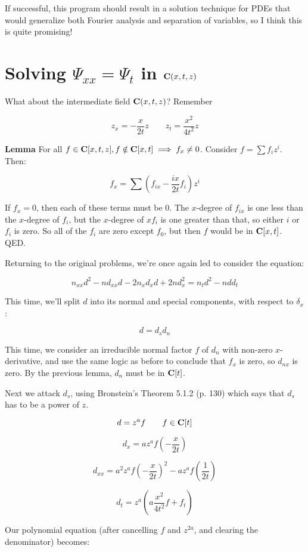 \documentclass{article}
\newcommand{\C}{\ensuremath{{\bf C}}}
\begin{document}
If successful, this program should result in a solution technique for
PDEs that would generalize both Fourier analysis and separation of
variables, so I think this is quite promising!


\vfill\eject
\section*{Solving $\Psi_{xx}=\Psi_t$ in $\C(x,t,z)$}

What about the intermediate field $\C(x,t,z)$?  Remember

$$z_x = -\frac{x}{2t} z \qquad z_t = \frac{x^2}{4t^2} z$$

{\bf Lemma}  For all $f \in \C[x,t,z], f \notin \C[x,t] \implies f_x \ne 0$.
Consider $f = \sum f_i z^i$.  Then:

$$f_x = \sum \left( f_{ix} - \frac{ix}{2t} f_i \right) z^i$$

If $f_x = 0$, then each of these terms must be 0.  The $x$-degree of $f_{ix}$
is one less than the $x$-degree of $f_i$, but the $x$-degree of $xf_i$ is
one greater than that, so either $i$ or $f_i$ is zero.  So all of the $f_i$
are zero except $f_0$, but then $f$ would be in $\C[x,t]$.  QED.

Returning to the original problems, we're once again led to consider the equation:

$$n_{xx} d^2 - n d_{xx} d - 2 n_{x}d_{x}d + 2nd_x^2 = n_t d^2 - n d d_t$$

This time, we'll split $d$ into its normal and special components,
with respect to $\delta_x$:

$$d =d_s d_n$$

This time, we consider an irreducible normal factor $f$ of $d_n$ with
non-zero $x$-derivative, and use the same logic as before to conclude
that $f_x$ is zero, so $d_{nx}$ is zero.  By the previous lemma,
$d_{n}$ must be in $\C[t]$.

Next we attack $d_s$, using Bronstein's Theorem 5.1.2 (p. 130) which
says that $d_s$ has to be a power of $z$.

$$d=z^a f \qquad f \in \C[t]$$

$$d_x = a z^a f \left( - \frac{x}{2t} \right)$$

$$d_{xx} = a^2 z^a f \left( - \frac{x}{2t} \right)^2 - a z^a f \left( \frac{1}{2t} \right)$$

$$d_t = z^a \left( a \frac{x^2}{4t^2} f + f_t\right)$$

Our polynomial equation (after cancelling $f$ and $z^{2a}$, and clearing the denominator) becomes:
\end{document}
